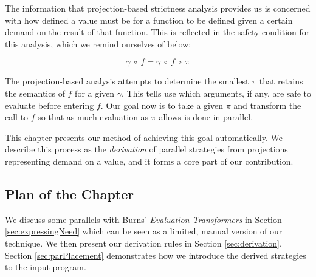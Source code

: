 The information that projection-based strictness analysis provides us is
concerned with how defined a value must be for a function to be defined given a
certain demand on the result of that function. This is reflected in the
safety condition for this analysis, which we remind ourselves of below:

\begin{equation}
\gamma \ \circ \ f = \gamma \ \circ \ f \ \circ \ \pi
\end{equation}

The projection-based analysis attempts to determine the smallest $\pi$ that
retains the semantics of $f$ for a given $\gamma$. This tells use which
arguments, if any, are safe to evaluate before entering $f$. Our goal now is to
take a given $\pi$ and transform the call to $f$ so that as much evaluation as
$\pi$ allows is done in parallel.

This chapter presents our method of achieving this goal automatically. We
describe this process as the \emph{derivation} of parallel strategies from
projections representing demand on a value, and it forms a core part of our
contribution.

\subsection*{Plan of the Chapter}

We discuss some parallels with Burns' \emph{Evaluation Transformers} in Section
\ref{sec:expressingNeed} which can be seen as a limited, manual version of our
technique. We then present our derivation rules in Section
\ref{sec:derivation}.  Section \ref{sec:parPlacement} demonstrates how we
introduce the derived strategies to the input program.
